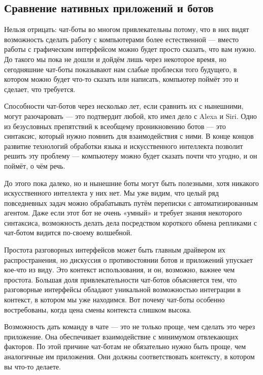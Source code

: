 \subsection{Сравнение нативных приложений и ботов} 
\label{sec:analysis:botsvsnative}

Нельзя отрицать: чат-боты во многом привлекательны потому, что в них видят возможность сделать работу с компьютерами более естественной — вместо работы с графическим интерфейсом можно будет просто сказать, что вам нужно. До такого мы пока не дошли и дойдём лишь через некоторое время, но сегодняшние чат-боты показывают нам слабые проблески того будущего, в котором можно будет что-то сказать или написать, компьютер поймёт это и сделает, что требуется.

Способности чат-ботов через несколько лет, если сравнить их с нынешними, могут разочаровать — это подтвердит любой, кто имел дело с Alexa и Siri. Одно из безусловных препятствий к всеобщему проникновению ботов — это синтаксис, который нужно помнить для взаимодействия с ними. В конце концов развитие технологий обработки языка и искусственного интеллекта позволит решить эту проблему — компьютеру можно будет сказать почти что угодно, и он поймёт, о чём речь.

До этого пока далеко, но и нынешние боты могут быть полезными, хотя никакого искусственного интеллекта у них нет. Мы уже видим, что целый ряд повседневных задач можно обрабатывать путём переписки с автоматизированным агентом. Даже если этот бот не очень «умный» и требует знания некоторого синтаксиса, возможность делать дела посредством короткого обмена репликами с чат-ботом видится по-своему волшебной.

Простота разговорных интерфейсов может быть главным драйвером их распространения, но дискуссия о противостоянии ботов и приложений упускает кое-что из виду. Это контекст использования, и он, возможно, важнее чем простота. Большая доля привлекательности чат-ботов объясняется тем, что разговорные интерфейсы обладают уникальной возможностью интеграции в контекст, в котором мы уже находимся. Вот почему чат-боты особенно востребованы, когда цена смены контекста слишком высока.

Возможность дать команду в чате — это не только проще, чем сделать это через приложение. Она обеспечивает взаимодействие с минимумом отвлекающих факторов. По этой причине чат-ботам не обязательно нужно быть проще, чем аналогичные им приложения. Они должны соответствовать контексту, в котором вы что-то делаете.

